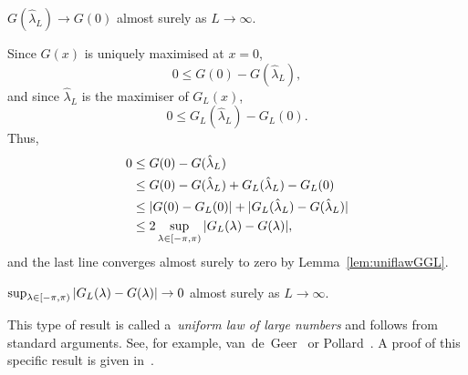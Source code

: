 \documentclass[journal]{IEEEtran}
\begin{document}


\begin{lemma}\label{lem:convtoexpGlamL} 
$G(\hat{\lambda}_L) \rightarrow G(0)$ almost surely as $L \rightarrow \infty$.
\end{lemma}
\begin{IEEEproof}
Since $G(x)$ is uniquely maximised at $x=0$,
\[
0 \leq G(0) - G(\hat{\lambda}_L),
\]
and since $\hat{\lambda}_L$ is the maximiser of $G_L(x)$,
\[ 
0 \leq G_L(\hat{\lambda}_L) - G_L(0).
\]
Thus,
\begin{align*}
0 &\leq G(0) - G(\hat{\lambda}_L) \\ 
& \leq G(0) - G(\hat{\lambda}_L) + G_L(\hat{\lambda}_L) - G_L(0) \\
& \leq |G(0) - G_L(0)| + |G_L(\hat{\lambda}_L) - G(\hat{\lambda}_L)| \\
&\leq 2\sup_{\lambda \in [-\pi, \pi)} {\vert G_L(\lambda) - G(\lambda) \vert},
\end{align*}
and the last line converges almost surely to zero by Lemma~\ref{lem:uniflawGGL}.
\end{IEEEproof}

\begin{lemma}\label{lem:uniflawGGL} 
$\sup_{\lambda \in [-\pi, \pi)}{\vert G_L(\lambda) - G(\lambda) \vert} \rightarrow 0$ almost surely as $L \rightarrow \infty$.
\end{lemma}
\begin{IEEEproof}
This type of result is called a~\emph{uniform law of large numbers} and follows from standard arguments.  See, for example, van~de~Geer~\cite[Ch.~3]{van2009empirical} or Pollard~\citep[Ch.~2]{Pollard_conv_stat_proc_1984}.  A proof of this specific result is given in~\cite[Lemma~2]{McKilliam_leastsqPSKpilotsdata_arxiv}.
\end{IEEEproof}
\end{document}

